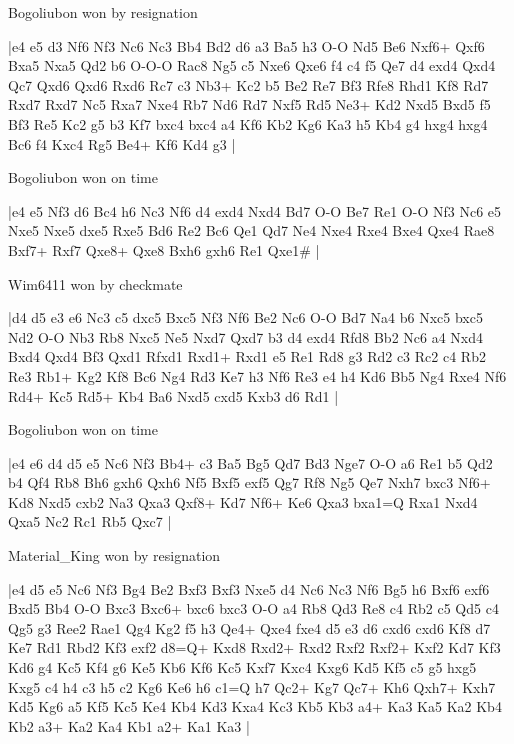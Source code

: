 \showboard

Bogoliubon won by resignation

\makegametitle
|e4 e5 d3 Nf6 Nf3 Nc6 Nc3 Bb4 Bd2 d6 a3 Ba5 h3 O-O Nd5 Be6 Nxf6+ Qxf6 Bxa5 Nxa5 Qd2 b6 O-O-O Rac8 Ng5 c5 Nxe6 Qxe6 f4 c4 f5 Qe7 d4 exd4 Qxd4 Qc7 Qxd6 Qxd6 Rxd6 Rc7 c3 Nb3+ Kc2 b5 Be2 Re7 Bf3 Rfe8 Rhd1 Kf8 Rd7 Rxd7 Rxd7 Nc5 Rxa7 Nxe4 Rb7 Nd6 Rd7 Nxf5 Rd5 Ne3+ Kd2 Nxd5 Bxd5 f5 Bf3 Re5 Kc2 g5 b3 Kf7 bxc4 bxc4 a4 Kf6 Kb2 Kg6 Ka3 h5 Kb4 g4 hxg4 hxg4 Bc6 f4 Kxc4 Rg5 Be4+ Kf6 Kd4 g3  |

\showboard

Bogoliubon won on time

\makegametitle
|e4 e5 Nf3 d6 Bc4 h6 Nc3 Nf6 d4 exd4 Nxd4 Bd7 O-O Be7 Re1 O-O Nf3 Nc6 e5 Nxe5 Nxe5 dxe5 Rxe5 Bd6 Re2 Bc6 Qe1 Qd7 Ne4 Nxe4 Rxe4 Bxe4 Qxe4 Rae8 Bxf7+ Rxf7 Qxe8+ Qxe8 Bxh6 gxh6 Re1 Qxe1\#  |

\showboard

Wim6411 won by checkmate

\makegametitle
|d4 d5 e3 e6 Nc3 c5 dxc5 Bxc5 Nf3 Nf6 Be2 Nc6 O-O Bd7 Na4 b6 Nxc5 bxc5 Nd2 O-O Nb3 Rb8 Nxc5 Ne5 Nxd7 Qxd7 b3 d4 exd4 Rfd8 Bb2 Nc6 a4 Nxd4 Bxd4 Qxd4 Bf3 Qxd1 Rfxd1 Rxd1+ Rxd1 e5 Re1 Rd8 g3 Rd2 c3 Rc2 c4 Rb2 Re3 Rb1+ Kg2 Kf8 Bc6 Ng4 Rd3 Ke7 h3 Nf6 Re3 e4 h4 Kd6 Bb5 Ng4 Rxe4 Nf6 Rd4+ Kc5 Rd5+ Kb4 Ba6 Nxd5 cxd5 Kxb3 d6 Rd1  |

\showboard

Bogoliubon won on time

\makegametitle
|e4 e6 d4 d5 e5 Nc6 Nf3 Bb4+ c3 Ba5 Bg5 Qd7 Bd3 Nge7 O-O a6 Re1 b5 Qd2 b4 Qf4 Rb8 Bh6 gxh6 Qxh6 Nf5 Bxf5 exf5 Qg7 Rf8 Ng5 Qe7 Nxh7 bxc3 Nf6+ Kd8 Nxd5 cxb2 Na3 Qxa3 Qxf8+ Kd7 Nf6+ Ke6 Qxa3 bxa1=Q Rxa1 Nxd4 Qxa5 Nc2 Rc1 Rb5 Qxc7  |

\showboard

Material\_King won by resignation

\makegametitle
|e4 d5 e5 Nc6 Nf3 Bg4 Be2 Bxf3 Bxf3 Nxe5 d4 Nc6 Nc3 Nf6 Bg5 h6 Bxf6 exf6 Bxd5 Bb4 O-O Bxc3 Bxc6+ bxc6 bxc3 O-O a4 Rb8 Qd3 Re8 c4 Rb2 c5 Qd5 c4 Qg5 g3 Ree2 Rae1 Qg4 Kg2 f5 h3 Qe4+ Qxe4 fxe4 d5 e3 d6 cxd6 cxd6 Kf8 d7 Ke7 Rd1 Rbd2 Kf3 exf2 d8=Q+ Kxd8 Rxd2+ Rxd2 Rxf2 Rxf2+ Kxf2 Kd7 Kf3 Kd6 g4 Kc5 Kf4 g6 Ke5 Kb6 Kf6 Kc5 Kxf7 Kxc4 Kxg6 Kd5 Kf5 c5 g5 hxg5 Kxg5 c4 h4 c3 h5 c2 Kg6 Ke6 h6 c1=Q h7 Qc2+ Kg7 Qc7+ Kh6 Qxh7+ Kxh7 Kd5 Kg6 a5 Kf5 Kc5 Ke4 Kb4 Kd3 Kxa4 Kc3 Kb5 Kb3 a4+ Ka3 Ka5 Ka2 Kb4 Kb2 a3+ Ka2 Ka4 Kb1 a2+ Ka1 Ka3  |

